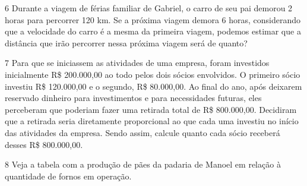 {


\num{6} Durante a viagem de férias familiar de Gabriel, o carro de seu pai
demorou 2 horas para percorrer 120 km. Se a próxima viagem demora 6
horas, considerando que a velocidade do carro é a mesma da primeira
viagem, podemos estimar que a distância que irão percorrer nessa próxima viagem será de quanto?



\num{7} Para que se iniciassem as atividades de uma empresa, foram investidos
inicialmente R\$ 200.000,00 ao todo pelos dois sócios envolvidos. O primeiro
sócio investiu R\$ 120.000,00 e o segundo, R\$ 80.000,00. Ao final do ano,
após deixarem reservado dinheiro para investimentos e para necessidades
futuras, eles perceberam que poderiam fazer uma retirada total de R\$ 800.000,00. Decidiram que a retirada seria diretamente proporcional ao que
cada uma investiu no início das atividades da empresa. Sendo assim,
calcule quanto cada sócio receberá desses R\$ 800.000,00.



\num{8} Veja a tabela com a produção de pães da padaria de Manoel em relação à quantidade de fornos em operação.


}
